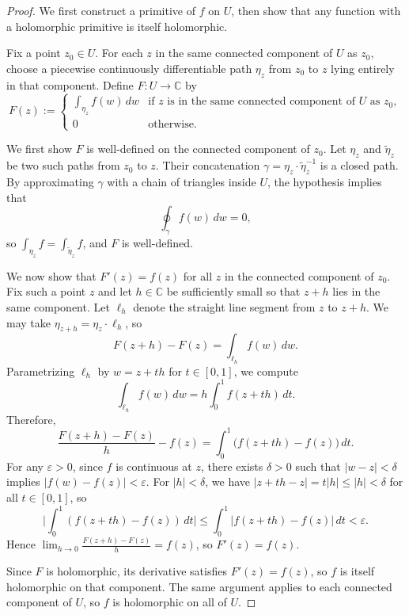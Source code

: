 \begin{proof}
    We first construct a primitive of $f$ on $U$, then show that any function with a holomorphic primitive is itself holomorphic.

    Fix a point $z_0 \in U$. For each $z$ in the same connected component of $U$ as $z_0$, choose a piecewise continuously differentiable path $\eta_z$ from $z_0$ to $z$ lying entirely in that component. Define $F : U \to \mathbb{C}$ by
    $$F(z) := \begin{cases}
        \displaystyle\int_{\eta_z} f(w)\,dw & \text{if } z \text{ is in the same connected component of } U \text{ as } z_0,\\[1.5em]
        0 & \text{otherwise.}
    \end{cases}$$

    We first show $F$ is well-defined on the connected component of $z_0$. Let $\eta_z$ and $\tilde{\eta}_z$ be two such paths from $z_0$ to $z$. Their concatenation $\gamma = \eta_z \cdot \tilde{\eta}_z^{-1}$ is a closed path. By approximating $\gamma$ with a chain of triangles inside $U$, the hypothesis implies that
    $$\oint_{\gamma} f(w)\,dw = 0,$$
    so $\int_{\eta_z} f = \int_{\tilde{\eta}_z} f$, and $F$ is well-defined.

    We now show that $F'(z) = f(z)$ for all $z$ in the connected component of $z_0$. Fix such a point $z$ and let $h \in \mathbb{C}$ be sufficiently small so that $z + h$ lies in the same component. Let $\ell_h$ denote the straight line segment from $z$ to $z + h$. We may take $\eta_{z+h} = \eta_z \cdot \ell_h$, so
    $$F(z + h) - F(z) = \int_{\ell_h} f(w)\,dw.$$
    Parametrizing $\ell_h$ by $w = z + th$ for $t \in [0,1]$, we compute
    $$\int_{\ell_h} f(w)\,dw = h \int_0^1 f(z + th)\,dt.$$
    Therefore,
    $$\frac{F(z+h) - F(z)}{h} - f(z) = \int_0^1 \bigl(f(z + th) - f(z)\bigr)\,dt.$$
    For any $\varepsilon > 0$, since $f$ is continuous at $z$, there exists $\delta > 0$ such that $|w - z| < \delta$ implies $|f(w) - f(z)| < \varepsilon$. For $|h| < \delta$, we have $|z + th - z| = t|h| \leq |h| < \delta$ for all $t \in [0,1]$, so
    $$\biggl|\int_0^1 (f(z + th) - f(z))\,dt\biggr| \leq \int_0^1 |f(z + th) - f(z)|\,dt < \varepsilon.$$
    Hence $\lim_{h \to 0} \frac{F(z+h) - F(z)}{h} = f(z)$, so $F'(z) = f(z)$.

    Since $F$ is holomorphic, its derivative satisfies $F'(z) = f(z)$, so $f$ is itself holomorphic on that component. The same argument applies to each connected component of $U$, so $f$ is holomorphic on all of $U$.
\end{proof}
